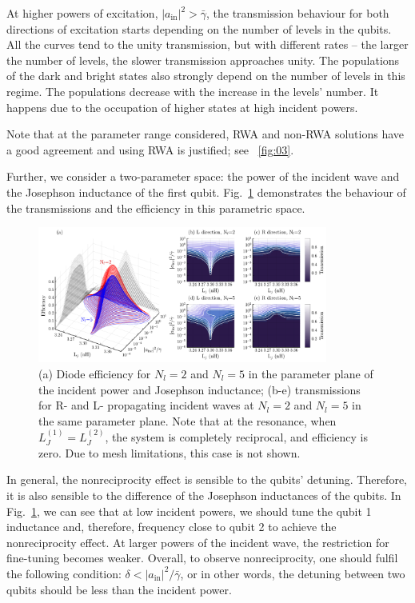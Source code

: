 \documentclass[lettersize,journal]{IEEEtran}
\providecommand{\DIFaddtex}[1]{{\protect\color{blue}\uwave{#1}}} %
\providecommand{\DIFaddbegin}{} %
\providecommand{\DIFaddend}{} %
\providecommand{\DIFadd}[1]{\texorpdfstring{\DIFaddtex{#1}}{#1}} %
\newcommand{\DIFaddincludegraphics}[2][]{{\color{blue}\fbox{\DIFOincludegraphics[#1]{#2}}}} %
\DeclareRobustCommand{\DIFaddbegin}{\DIFOaddbegin \let\includegraphics\DIFaddincludegraphics} %
\DeclareRobustCommand{\DIFaddend}{\DIFOaddend \let\includegraphics\DIFOincludegraphics} %
\begin{document}
At higher powers of excitation, $|a_\mathrm{in}|^2 > \bar{\gamma}$, the transmission behaviour for both directions of excitation starts depending on the number of levels in the qubits.
All the curves tend to the unity transmission, but with different rates -- the larger the number of levels, the slower transmission approaches unity.
The populations of the dark and bright states also strongly depend on the number of levels in this regime.
The populations decrease with the increase in the levels' number.
It happens due to the occupation of higher states at high incident powers.

Note that at the parameter range considered, RWA and non-RWA solutions have a good agreement and using RWA is justified; see \DIFaddbegin \DIFadd{Fig.}\DIFaddend ~\ref{fig:03}.

Further, we consider a two-parameter space: the power of the incident wave and the Josephson inductance of the first qubit.
Fig.~\ref{fig:05} demonstrates the behaviour of the transmissions and the efficiency in this parametric space.
\begin{figure}[t]
    \centering
    \includegraphics[width=0.85\textwidth]{fig_5}
    \caption{(a) Diode efficiency for $N_l = 2$ and $N_l = 5$ in the parameter plane of the incident power and Josephson inductance; (b-e) transmissions for R- and L- propagating incident waves at $N_l = 2$ and $N_l = 5$ in the same parameter plane. Note that at the resonance, when $L_J^{(1)} = L_J^{(2)}$, the system is completely reciprocal, and efficiency is zero. Due to mesh limitations, this case is not shown.}
    \label{fig:05}
\end{figure}
In general, the nonreciprocity effect is sensible to the qubits' detuning.
Therefore, it is also sensible to the difference of the Josephson inductances of the qubits.
In Fig.~\ref{fig:05}, we can see that at low incident powers, we should tune the qubit 1 inductance and, therefore, frequency close to qubit 2 to achieve the nonreciprocity effect.
At larger powers of the incident wave, the restriction for fine-tuning becomes weaker.
Overall, to observe nonreciprocity, one should fulfil the following condition: $\delta < |a_\mathrm{in}|^2 / \bar{\gamma}$, or in other words, the detuning between two qubits should be less than the incident power.
\end{document}
